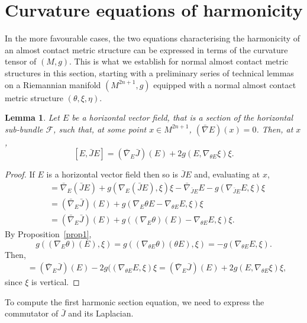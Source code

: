 \documentclass[a4paper,reqno]{amsart}
\newtheorem{lemma}[thm]{Lemma}
\theoremstyle{definition}
\theoremstyle{remark}
\theoremstyle{plain}
\numberwithin{equation}{section}
\newcommand{\f}{\mathcal{F}}
\begin{document}
\section{Curvature equations of harmonicity} \label{sec3}

In the more favourable cases, the two equations characterising
the harmonicity of an almost contact metric structure can be expressed
in terms of the curvature tensor of $(M,g)$. This is what we
establish for normal almost contact metric structures in this section,
starting with a preliminary series of technical lemmas on a
Riemannian manifold $(M^{2n+1},g)$ equipped with a normal almost
contact metric structure $(\theta,\xi,\eta)$.

\begin{lemma}\label{lemma2}
  Let $E$ be a horizontal vector field, that is a section of the
  horizontal sub-bundle $\f$, such that, at some point
  $x\in M^{2n+1}$, $(\bar{\nabla}E)(x)=0$. Then, at $x$,
$$[E,\bar{J}E]= (\bar{\nabla}_E \bar{J}) (E) +2 g(E, \nabla_{\theta E} \xi) \xi .$$
\end{lemma}

\begin{proof}
If $E$ is a horizontal vector field then so is $\bar{J}E$ and, evaluating at $x$,
\begin{align*} 
[E,\bar{J}E] & = \bar{\nabla}_{E}(\bar{J}E)+g(\nabla_E (\bar{J}E), \xi) \xi -\bar{\nabla}_{\bar{J}E}E -g(\nabla_{\bar{J}E} E, \xi) \xi \\
& = (\bar{\nabla}_E \bar{J}) (E)+g(\nabla_E{\theta E}-\nabla_{\theta E}E, \xi) \xi\\
&= (\bar{\nabla}_E \bar{J}) (E)+g((\nabla_E\theta)(E)-\nabla_{\theta E}E, \xi) \xi.
\end{align*}
By Proposition~\ref{prop1}, 
$$g((\nabla_E\theta)(E), \xi)
=g((\nabla_{\theta E}\theta)(\theta E), \xi)
=- g(\nabla_{\theta E}E, \xi).$$
Then,
\begin{align*}
[E,\bar{J}E] & =(\bar{\nabla}_E \bar{J}) (E)-2g((\nabla_{\theta E}E, \xi) \xi
=(\bar{\nabla}_E \bar{J}) (E)+2g(E, \nabla_{\theta E}\xi) \xi,
\end{align*}
since $\xi$ is vertical.
\end{proof}

To compute the first harmonic section equation, we need to
express the commutator of $\bar{J}$ and its Laplacian.
\end{document}
